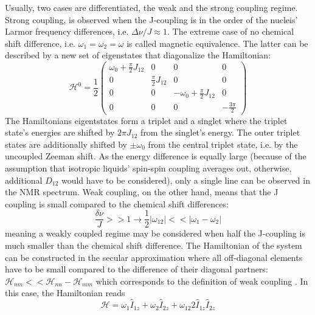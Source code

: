            Usually, two cases are differentiated, the weak and the strong coupling regime. Strong coupling, is observed when the J-coupling is in the order of the nucleis' Larmor frequency differences, i.e. $\Delta \nu / J \approx 1$. The extreme case of no chemical shift difference, i.e. $\omega_1 = \omega_2=\omega$ is called magnetic equivalence.
            The latter can be described by a new set of eigenstates that diagonalize the Hamiltonian:
            \begin{equation}
                \mathcal{H}^0 = \frac{1}{2}
                \begin{pmatrix}
                    \omega_0+ \tfrac{\pi}{2} J_{12} & 0 & 0 & 0\\
                    0 &  \tfrac{\pi}{2}J_{12} & 0 & 0 \\
                    0 & 0 & -\omega_0 + \tfrac{\pi}{2}J_{12} & 0\\
                    0 & 0 & 0 & -\tfrac{3\pi}{2}
                \end{pmatrix}
            \end{equation}
            The Hamiltonians eigentstates form a triplet and a singlet where the triplet state's energies are shifted by $2\pi J_{12}$ from the singlet's energy. The outer triplet states are additionally shifted by $\pm\omega_0$ from the central triplet state, i.e. by the uncoupled Zeeman shift.
            As the energy difference is equally large (because of the assumption that isotropic liquids' spin-spin coupling averages out, otherwise, additional $D_{12}$ would have to be considered), only a single line can be observed in the NMR spectrum.
            Weak coupling, on the other hand, means that the J coupling is small compared to the chemical shift differences:
            \begin{equation*}
                \frac{\delta\nu}{J} >> 1 \rightarrow \frac{1}{2} |\omega_{12}| << |\omega_1-\omega_2|
            \end{equation*}
            meaning a weakly coupled regime may be considered when half the J-coupling is much smaller than the chemical shift difference. The Hamiltonian of the system can be constructed in the secular approximation where all off-diagonal elements have to be small compared to the difference of their diagonal partners: $\mathcal{H}_{nm} << \mathcal{H}_{nn} - \mathcal{H}_{mm}$ which corresponds to the definition of weak coupling \cite{levitt_spin_nodate}.
            In this case, the Hamiltonian reads
            \begin{equation}
                \mathcal{H} = \omega_1\hat{I}_{1z} + \omega_2\hat{I}_{2z} + \omega_{12}2\hat{I}_{1z}\hat{I}_{2z}
            \end{equation}
